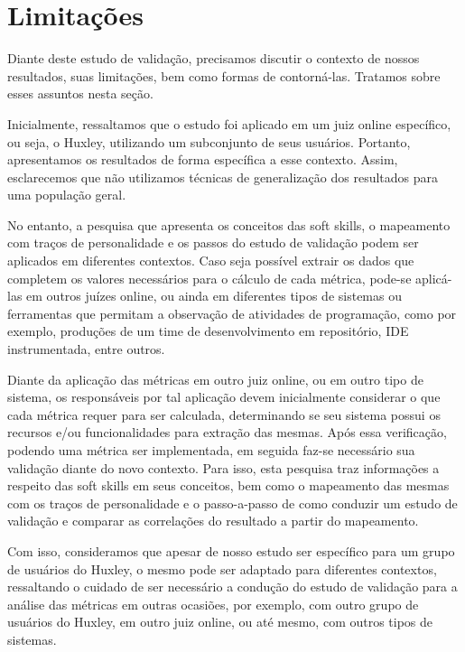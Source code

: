 \section{Limitações}
\label{sec:limitacoes}

Diante deste estudo de validação, precisamos discutir o contexto de nossos resultados, suas limitações, bem como formas de contorná-las. Tratamos sobre esses assuntos nesta seção.

Inicialmente, ressaltamos que o estudo foi aplicado em um juiz online específico, ou seja, o Huxley, utilizando um subconjunto de seus usuários. Portanto, apresentamos os resultados de forma específica a esse contexto. Assim, esclarecemos que não utilizamos técnicas de generalização dos resultados para uma população geral. %

No entanto, a pesquisa que apresenta os conceitos das soft skills, o mapeamento com traços de personalidade e os passos do estudo de validação podem ser aplicados em diferentes contextos.
Caso seja possível extrair os dados que completem os valores necessários para o cálculo de cada métrica, pode-se aplicá-las em outros juízes online, ou ainda em diferentes tipos de sistemas ou ferramentas que permitam a observação de atividades de programação, como por exemplo, produções de um time de desenvolvimento em repositório, IDE instrumentada, entre outros.

Diante da aplicação das métricas em outro juiz online, ou em outro tipo de sistema, os responsáveis por tal aplicação devem inicialmente considerar o que cada métrica requer para ser calculada, determinando se seu sistema possui os recursos e/ou funcionalidades para extração das mesmas. Após essa verificação, podendo uma métrica ser implementada, em seguida faz-se necessário sua validação diante do novo contexto. Para isso, esta pesquisa traz informações a respeito das soft skills em seus conceitos, bem como o mapeamento das mesmas com os traços de personalidade e o passo-a-passo de como conduzir um estudo de validação e comparar as correlações do resultado a partir do mapeamento.

Com isso, consideramos que apesar de nosso estudo ser específico para um grupo de usuários do Huxley, o mesmo pode ser adaptado para diferentes contextos, ressaltando o cuidado de ser necessário a condução do estudo de validação para a análise das métricas em outras ocasiões, por exemplo, com outro grupo de usuários do Huxley, em outro juiz online, ou até mesmo, com outros tipos de sistemas. 

